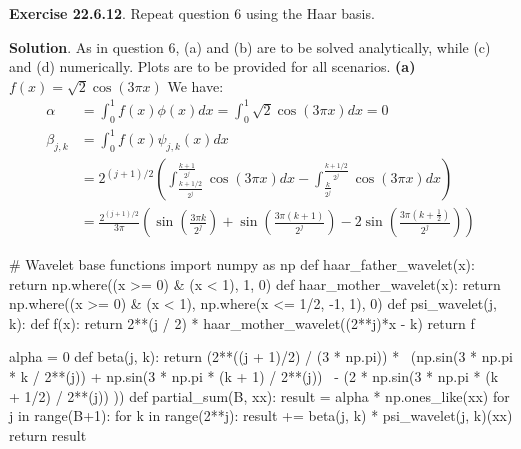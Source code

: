 \textbf{Exercise 22.6.12}. Repeat question 6 using the Haar basis.

\textbf{Solution}.
As in question 6, (a) and (b) are to be solved analytically, while (c)
and (d) numerically. Plots are to be provided for all scenarios.
\textbf{(a)} \(f(x) = \sqrt{2} \cos (3 \pi x)\)
We have:
\begin{align*}
\alpha &= \int_{0}^{1} f(x) \phi(x) dx = \int_{0}^{1} \sqrt{2} \cos (3 \pi x) dx = 0 \\
\beta_{j, k} &= \int_{0}^{1} f(x) \psi_{j, k}(x) dx \\
&= 2^{(j + 1)/2} \left( \int_{\frac{k + 1/2}{2^{j}}}^{\frac{k + 1}{2^{j}}} \cos(3 \pi x) dx - \int_{\frac{k}{2^{j}}}^{\frac{k + 1/2}{2^{j}}} \cos(3 \pi x) dx \right) \\
&= \frac{2^{(j + 1)/2}}{3 \pi} \left(
 \sin\left( \frac{3\pi k}{2^{j}} \right)
 + \sin\left( \frac{3\pi (k + 1)}{2^{j}} \right)
 -  2 \sin\left( \frac{3\pi \left(k + \frac{1}{2}\right)}{2^{j}} \right) 
\right)
\end{align*}

\begin{python}
# Wavelet base functions
import numpy as np
def haar_father_wavelet(x):
    return np.where((x >= 0) & (x < 1), 1, 0)
def haar_mother_wavelet(x):
    return np.where((x >= 0) & (x < 1), np.where(x <= 1/2, -1, 1), 0)
def psi_wavelet(j, k):
    def f(x):
        return 2**(j / 2) * haar_mother_wavelet((2**j)*x - k)
    return f
\end{python}

\begin{python}
alpha = 0
def beta(j, k):
    return (2**((j + 1)/2) / (3 * np.pi)) *  \
            (np.sin(3 * np.pi * k / 2**(j)) + np.sin(3 * np.pi * (k + 1) / 2**(j)) \
             - (2 * np.sin(3 * np.pi * (k + 1/2) / 2**(j)) ))
def partial_sum(B, xx):
    result = alpha * np.ones_like(xx)
    for j in range(B+1):
        for k in range(2**j):
            result += beta(j, k) * psi_wavelet(j, k)(xx)
    return result
\end{python}


